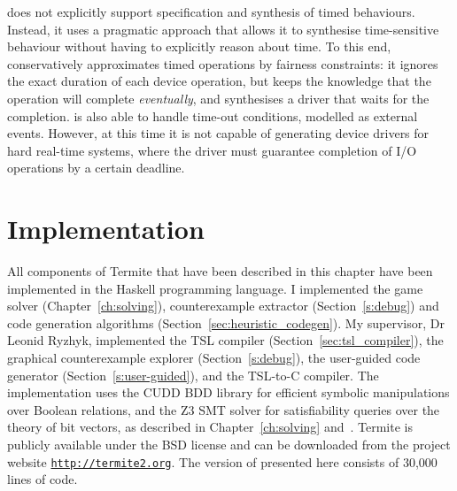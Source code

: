 \termite does not explicitly support specification and synthesis of timed behaviours.  Instead, it uses a pragmatic approach that allows it to synthesise time-sensitive behaviour without having to explicitly reason about time.  To this end, \termite conservatively approximates timed operations by fairness constraints: it ignores the exact duration of each device operation, but keeps the knowledge that the operation will complete \emph{eventually}, and synthesises a driver that waits for the completion.  \termite is also able to handle time-out conditions, modelled as external events.  However, at this time it is not capable of generating device drivers for hard real-time systems, where the driver must guarantee completion of I/O operations by a certain deadline.

\section{Implementation}

All components of Termite that have been described in this chapter have been implemented in the Haskell programming language. I implemented the game solver (Chapter~\ref{ch:solving}), counterexample extractor (Section~\ref{s:debug}) and code generation algorithms (Section~\ref{sec:heuristic_codegen}). My supervisor, Dr Leonid Ryzhyk, implemented the TSL compiler (Section~\ref{sec:tsl_compiler}), the graphical counterexample explorer (Section~\ref{s:debug}), the user-guided code generator (Section~\ref{s:user-guided}), and the TSL-to-C compiler.  The implementation uses the CUDD BDD library for efficient symbolic manipulations over Boolean relations, and the Z3 SMT solver for satisfiability queries over the theory of bit vectors, as described in Chapter~\ref{ch:solving} and~\cite{Walker_Ryzhyk_14}.  Termite is publicly available under the BSD license and can be downloaded from the project website \texttt{\url{http://termite2.org}}. The version of \termite presented here consists of 30,000 lines of code.  

